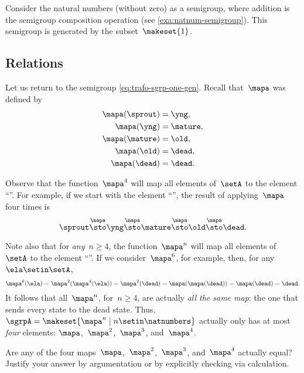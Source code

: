 \begin{example}
    Consider the natural numbers (without zero) as a semigroup, where addition is the semigroup composition operation (see \cref{exa:natnum-semigroup}).
    This semigroup is generated by the subset~$\makeset{1 }$.
\end{example}

\subsection{Relations}

Let us return to the semigroup \cref{eq:trafo-sgrp-one-gen}.
Recall that~$\mapa$ was defined by
%
\begin{align*}
    \mapa(\sprout) & =  \yng, \\
    \mapa(\yng)    & =  \mature, \\
    \mapa(\mature) & =  \old, \\
    \mapa( \old)   & = \dead, \\
    \mapa(\dead)   & = \dead.
\end{align*}

Observe that the function~$\mapa^4$ will map all elements of~$\setA$ to the element ``\dead''.
For example, if we start with the element ``\sprout'', the result of applying~$\mapa$ four times is
%
\begin{equation}
    \sprout \overset{\mapa}{\sto} \yng \overset{\mapa}{\sto} \mature \overset{\mapa}{\sto} \old \overset{\mapa}{\sto} \dead.
\end{equation}

Note also that for \emph{any}~$n \geq 4$, the function~$\mapa^n$ will map all elements of~$\setA$ to the element ``\dead''.
If we consider~$\mapa^6$, for example, then, for any~$\ela \setin \setA$,
%
\begin{equation}
    \mapa^6(\ela) = \mapa^2(\mapa^4(\ela)) = \mapa^2(\dead) = \mapa(\mapa(\dead)) = \mapa(\dead) = \dead.
\end{equation}
%
It follows that all~$\mapa^n$, for~$n \geq 4$, are actually \emph{all the same map}: the one that sends every state to the dead state.
Thus, ~$\sgrpA = \makeset{ \mapa^n \mid n \setin \natnumbers }$ actually only has at most \emph{four} elements: $\mapa$,~$\mapa^2$,~$\mapa^3$, and~$\mapa^4$.

\begin{gradedexercise}
    \label{ex:CheckRelations}
    Are any of the four maps~$\mapa$,~$\mapa^2$,~$\mapa^3$, and~$\mapa^4$ actually equal?
    Justify your answer by argumentation or by explicitly checking via calculation.
\end{gradedexercise}

